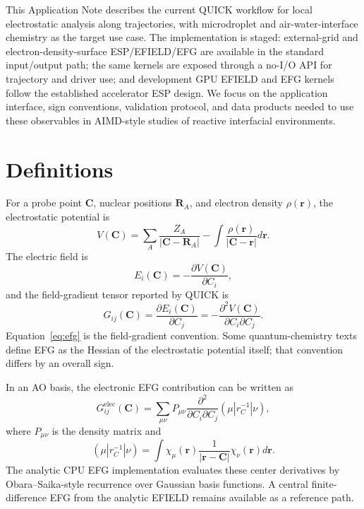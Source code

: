 \documentclass[journal=jctcce,manuscript=article,email=false]{achemso}
\newcommand{\quick}{QUICK}
\begin{document}
This Application Note describes the current \quick{} workflow for local
electrostatic analysis along trajectories, with microdroplet and
air-water-interface chemistry as the target use case.  The implementation
is staged: external-grid and electron-density-surface ESP/EFIELD/EFG are
available in the standard input/output path; the same kernels are exposed
through a no-I/O API for trajectory and driver use; and development GPU
EFIELD and EFG kernels follow the established accelerator ESP design.
We focus on the application interface, sign conventions, validation
protocol, and data products needed to use these observables in AIMD-style
studies of reactive interfacial environments.

\section{Definitions}

For a probe point \(\mathbf{C}\), nuclear positions \(\mathbf{R}_A\), and
electron density \(\rho(\mathbf{r})\), the electrostatic potential is
\begin{equation}
  V(\mathbf{C}) =
  \sum_A \frac{Z_A}{|\mathbf{C}-\mathbf{R}_A|}
  -
  \int
  \frac{\rho(\mathbf{r})}{|\mathbf{C}-\mathbf{r}|}
  d\mathbf{r}.
  \label{eq:esp}
\end{equation}
The electric field is
\begin{equation}
  E_i(\mathbf{C}) =
  -\frac{\partial V(\mathbf{C})}{\partial C_i},
  \label{eq:efield}
\end{equation}
and the field-gradient tensor reported by \quick{} is
\begin{equation}
  G_{ij}(\mathbf{C}) =
  \frac{\partial E_i(\mathbf{C})}{\partial C_j}
  =
  -\frac{\partial^2 V(\mathbf{C})}{\partial C_i\partial C_j}.
  \label{eq:efg}
\end{equation}
Equation~\ref{eq:efg} is the field-gradient convention.  Some
quantum-chemistry texts define EFG as the Hessian of the electrostatic
potential itself; that convention differs by an overall sign.

In an AO basis, the electronic EFG contribution can be written as
\begin{equation}
  G_{ij}^{\mathrm{elec}}(\mathbf{C}) =
  \sum_{\mu\nu} P_{\mu\nu}
  \frac{\partial^2}{\partial C_i\partial C_j}
  (\mu|r_C^{-1}|\nu),
  \label{eq:ao_efg}
\end{equation}
where \(P_{\mu\nu}\) is the density matrix and
\begin{equation}
  (\mu|r_C^{-1}|\nu) =
  \int
  \chi_\mu(\mathbf{r})
  \frac{1}{|\mathbf{r}-\mathbf{C}|}
  \chi_\nu(\mathbf{r})d\mathbf{r}.
\end{equation}
The analytic CPU EFG implementation evaluates these center derivatives by
Obara--Saika-style recurrence over Gaussian basis functions.\cite{ObaraSaika1986}
A central finite-difference EFG from the analytic EFIELD remains available
as a reference path.
\end{document}
